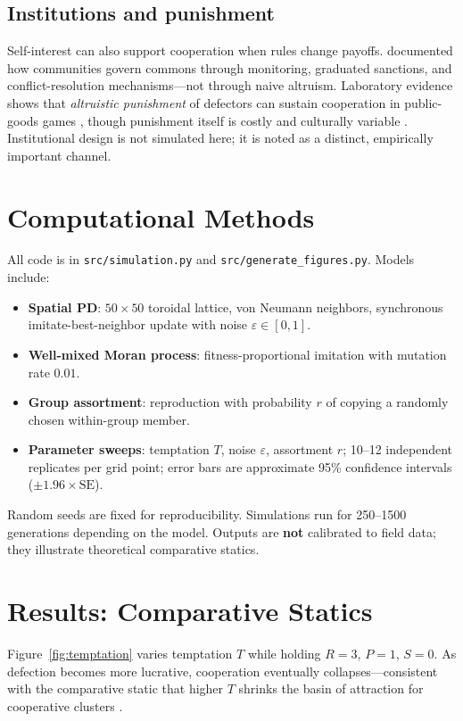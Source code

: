 \documentclass[11pt,a4paper]{article}
\begin{document}
\subsection{Institutions and punishment}

Self-interest can also support cooperation when rules change payoffs. \citet{ostrom1990} documented how communities govern commons through monitoring, graduated sanctions, and conflict-resolution mechanisms---not through naive altruism. Laboratory evidence shows that \emph{altruistic punishment} of defectors can sustain cooperation in public-goods games \citep{fehr2002}, though punishment itself is costly and culturally variable \citep{henrich2001}. Institutional design is not simulated here; it is noted as a distinct, empirically important channel.

\section{Computational Methods}

All code is in \texttt{src/simulation.py} and \texttt{src/generate\_figures.py}. Models include:
\begin{itemize}[noitemsep]
  \item \textbf{Spatial PD}: $50 \times 50$ toroidal lattice, von Neumann neighbors, synchronous imitate-best-neighbor update with noise $\varepsilon \in [0,1]$.
  \item \textbf{Well-mixed Moran process}: fitness-proportional imitation with mutation rate $0.01$.
  \item \textbf{Group assortment}: reproduction with probability $r$ of copying a randomly chosen within-group member.
  \item \textbf{Parameter sweeps}: temptation $T$, noise $\varepsilon$, assortment $r$; 10--12 independent replicates per grid point; error bars are approximate 95\% confidence intervals ($\pm 1.96 \times \text{SE}$).
\end{itemize}

Random seeds are fixed for reproducibility. Simulations run for 250--1500 generations depending on the model. Outputs are \textbf{not} calibrated to field data; they illustrate theoretical comparative statics.

\section{Results: Comparative Statics}

Figure~\ref{fig:temptation} varies temptation $T$ while holding $R=3$, $P=1$, $S=0$. As defection becomes more lucrative, cooperation eventually collapses---consistent with the comparative static that higher $T$ shrinks the basin of attraction for cooperative clusters \citep{nowak1992}.
\end{document}
